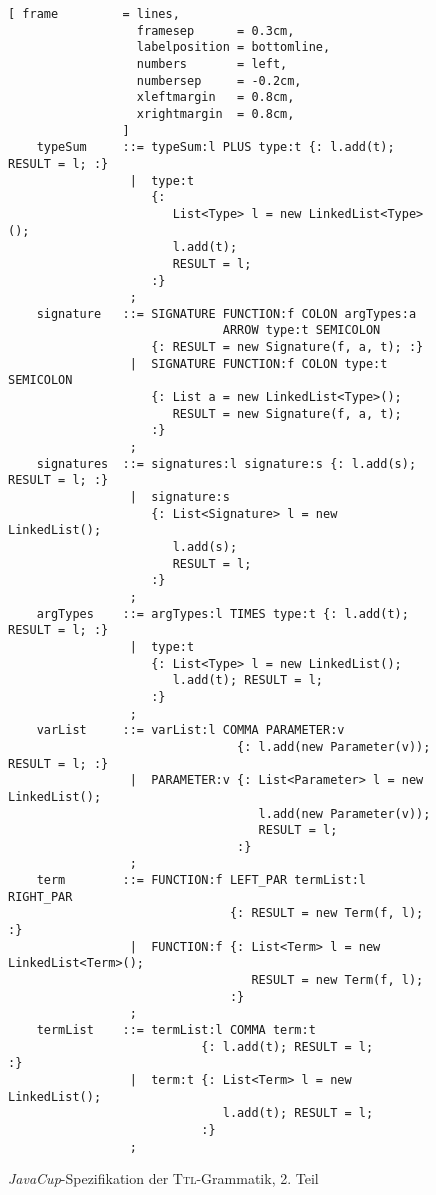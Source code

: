 \begin{figure}[!ht]
\centering
\begin{Verbatim}[ frame         = lines, 
                  framesep      = 0.3cm, 
                  labelposition = bottomline,
                  numbers       = left,
                  numbersep     = -0.2cm,
                  xleftmargin   = 0.8cm,
                  xrightmargin  = 0.8cm,
                ]
    typeSum     ::= typeSum:l PLUS type:t {: l.add(t); RESULT = l; :}   
                 |  type:t 
                    {: 
                       List<Type> l = new LinkedList<Type>(); 
                       l.add(t);  
                       RESULT = l; 
                    :}   
                 ;
    signature   ::= SIGNATURE FUNCTION:f COLON argTypes:a 
                              ARROW type:t SEMICOLON
                    {: RESULT = new Signature(f, a, t); :}
                 |  SIGNATURE FUNCTION:f COLON type:t SEMICOLON
                    {: List a = new LinkedList<Type>(); 
                       RESULT = new Signature(f, a, t); 
                    :}
                 ;
    signatures  ::= signatures:l signature:s {: l.add(s); RESULT = l; :}
                 |  signature:s 
                    {: List<Signature> l = new LinkedList(); 
                       l.add(s); 
                       RESULT = l; 
                    :}
                 ;    
    argTypes    ::= argTypes:l TIMES type:t {: l.add(t); RESULT = l; :}
                 |  type:t 
                    {: List<Type> l = new LinkedList(); 
                       l.add(t); RESULT = l; 
                    :}
                 ;
    varList     ::= varList:l COMMA PARAMETER:v 
                                {: l.add(new Parameter(v)); RESULT = l; :}
                 |  PARAMETER:v {: List<Parameter> l = new LinkedList(); 
                                   l.add(new Parameter(v)); 
                                   RESULT = l; 
                                :}
                 ;    
    term        ::= FUNCTION:f LEFT_PAR termList:l RIGHT_PAR 
                               {: RESULT = new Term(f, l); :}
                 |  FUNCTION:f {: List<Term> l = new LinkedList<Term>(); 
                                  RESULT = new Term(f, l); 
                               :}
                 ;
    termList    ::= termList:l COMMA term:t 
                           {: l.add(t); RESULT = l;            :}
                 |  term:t {: List<Term> l = new LinkedList(); 
                              l.add(t); RESULT = l; 
                           :}
                 ;
\end{Verbatim}
\vspace*{-0.3cm}
\caption{\textsl{JavaCup}-Spezifikation der \textsc{Ttl}-Grammatik, 2. Teil}
\label{fig:typeChecker.cup-2}
\end{figure}

